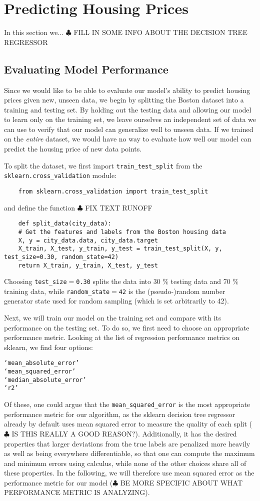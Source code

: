 \documentclass[12 pt]{article}
\numberwithin{equation}{section}
\begin{document}
\section{Predicting Housing Prices}
In this section we... $\clubsuit$ FILL IN SOME INFO ABOUT THE DECISION TREE REGRESSOR
\subsection{Evaluating Model Performance}
Since we would like to be able to evaluate our model's ability to predict housing prices given new, unseen data, we begin by splitting the Boston dataset into a training and testing set. By holding out the testing data and allowing our model to learn only on the training set, we leave ourselves an independent set of data we can use to verify that our model can generalize well to unseen data. If we trained on the \emph{entire} dataset, we would have no way to evaluate how well our model can predict the housing price of new data points.

To split the dataset, we first import \texttt{train\_test\_split} from the \texttt{sklearn.cross\_validation} module:
\begin{verbatim}
	from sklearn.cross_validation import train_test_split
\end{verbatim}
and define the function $\clubsuit$ FIX TEXT RUNOFF
\begin{verbatim}
	def split_data(city_data):
    # Get the features and labels from the Boston housing data
    X, y = city_data.data, city_data.target
    X_train, X_test, y_train, y_test = train_test_split(X, y, test_size=0.30, random_state=42)
    return X_train, y_train, X_test, y_test
\end{verbatim}
Choosing \texttt{test\_size$=$0.30} splits the data into 30 \% testing data and 70 \% training data, while \texttt{random\_state$=$42} is the (pseudo-)random number generator state used for random sampling (which is set arbitrarily to 42).

Next, we will train our model on the training set and compare with its performance on the testing set. To do so, we first need to choose an appropriate performance metric. Looking at the list of regression performance metrics on sklearn, we find four options:
\begin{verbatim} 	 
‘mean_absolute_error’ 
‘mean_squared_error’		 
‘median_absolute_error’		 
‘r2’
\end{verbatim}
Of these, one could argue that the \texttt{mean\_squared\_error} is the most appropriate performance metric for our algorithm, as the sklearn decision tree regressor already by default uses mean squared error to measure the quality of each split ($\clubsuit $ IS THIS REALLY A GOOD REASON?). Additionally, it has the desired properties that larger deviations from the true labels are penalized more heavily as well as being everywhere differentiable, so that one can compute the maximum and minimum errors using calculus, while none of the other choices share all of these properties. In the following, we will therefore use mean squared error as the performance metric for our model ($\clubsuit$ BE MORE SPECIFIC ABOUT WHAT PERFORMANCE METRIC IS ANALYZING). 
\end{document}
